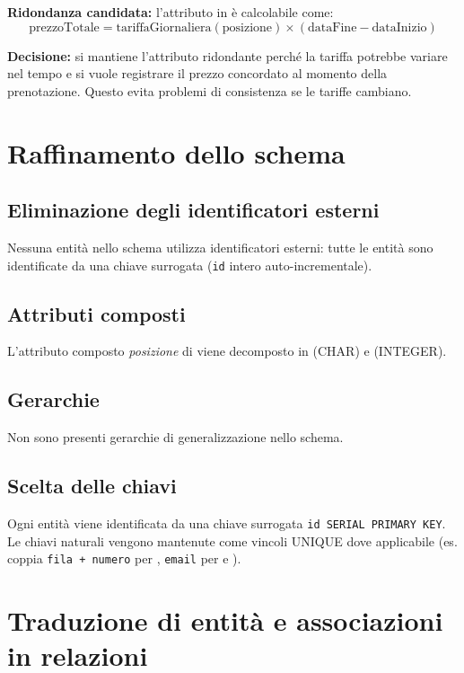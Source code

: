 \textbf{Ridondanza candidata:} l'attributo  in
 \`{e} calcolabile come:
\[
  \text{prezzoTotale} = \text{tariffaGiornaliera}(\text{posizione}) \times
  (\text{dataFine} - \text{dataInizio})
\]

\textbf{Decisione:} si mantiene l'attributo ridondante 
perch\'e la tariffa potrebbe variare nel tempo e si vuole registrare il prezzo
concordato al momento della prenotazione. Questo evita problemi di consistenza
se le tariffe cambiano.

\section{Raffinamento dello schema}

\subsection{Eliminazione degli identificatori esterni}
Nessuna entit\`{a} nello schema utilizza identificatori esterni: tutte le entit\`{a}
sono identificate da una chiave surrogata (\texttt{id} intero auto-incrementale).

\subsection{Attributi composti}
L'attributo composto \textit{posizione} di  viene decomposto
in  (CHAR) e  (INTEGER).

\subsection{Gerarchie}
Non sono presenti gerarchie di generalizzazione nello schema.

\subsection{Scelta delle chiavi}
Ogni entit\`{a} viene identificata da una chiave surrogata \texttt{id SERIAL PRIMARY KEY}.
Le chiavi naturali vengono mantenute come vincoli UNIQUE dove applicabile
(es. coppia \texttt{fila + numero} per , \texttt{email}
per  e ).

\section{Traduzione di entit\`{a} e associazioni in relazioni}

